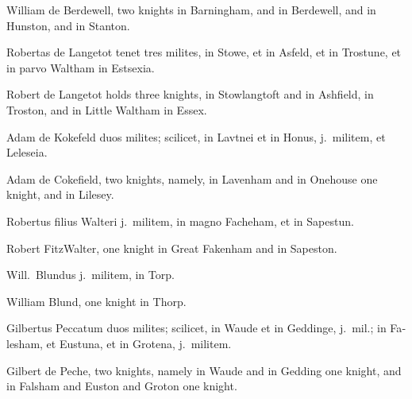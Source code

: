 \documentclass[10pt]{book}
\begin{document}
\begin{paracol}{2}
\switchcolumn

William de Berdewell, two knights in Barningham, and in Berdewell, and in Hunston, and in Stanton.

\switchcolumn*

\begin{otherlanguage}{latin}
Robertas de Langetot tenet tres milites, in Stowe, et in Asfeld, et in Trostune, et in parvo Waltham in Estsexia.
\end{otherlanguage}

\switchcolumn

Robert de Langetot holds three knights, in Stowlangtoft and in Ashfield, in Troston, and in Little Waltham in Essex.

\switchcolumn*

\begin{otherlanguage}{latin}
Adam de Kokefeld duos milites; scilicet, in Lavtnei et in Honus, j.\ militem, et Leleseia.
\end{otherlanguage}

\switchcolumn

Adam de Cokefield, two knights, namely, in Lavenham and in Onehouse one knight, and in Lilesey.

\switchcolumn*

\begin{otherlanguage}{latin}
Robertus filius Walteri j.\ militem, in magno Facheham, et in Sapestun.
\end{otherlanguage}

\switchcolumn

Robert FitzWalter, one knight in Great Fakenham and in Sapeston.

\switchcolumn*

\begin{otherlanguage}{latin}
Will.\ Blundus j.\ militem, in Torp.
\end{otherlanguage}

\switchcolumn

William Blund, one knight in Thorp.

\switchcolumn*

\begin{otherlanguage}{latin}
Gilbertus Peccatum duos milites; scilicet, in Waude et in Geddinge, j.\ mil.; in Falesham, et Eustuna, et in Grotena, j.\ militem.
\end{otherlanguage}

\switchcolumn

Gilbert de Peche, two knights, namely in Waude and in Gedding one knight, and in Falsham and Euston and Groton one knight.


\end{paracol}
\end{document}
